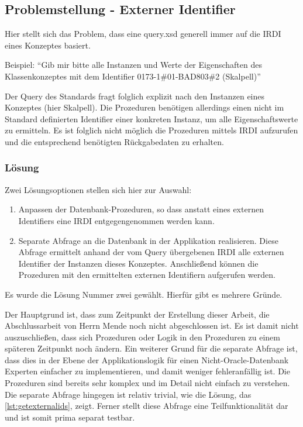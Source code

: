 \subsection{Problemstellung - Externer Identifier}\label{sec:problemidentifier}

Hier stellt sich das Problem, dass eine query.xsd generell immer auf die \gls{IRDI} eines Konzeptes basiert.

Beispiel: \enquote{Gib mir bitte alle Instanzen und Werte der Eigenschaften des Klassenkonzeptes mit dem Identifier 0173-1\#01-BAD803\#2 (Skalpell)}

Der Query des Standards fragt folglich explizit nach den Instanzen eines Konzeptes (hier Skalpell). Die Prozeduren benötigen allerdings einen nicht im Standard definierten Identifier einer konkreten Instanz, um alle Eigenschaftswerte zu ermitteln. Es ist folglich nicht möglich die Prozeduren mittels \gls{IRDI} aufzurufen und die entsprechend benötigten Rückgabedaten zu erhalten.

\subsubsection{Lösung}

Zwei Lösungsoptionen stellen sich hier zur Auswahl:
\begin{enumerate}
\item Anpassen der Datenbank-Prozeduren, so dass anstatt eines externen Identifiers eine \gls{IRDI} entgegengenommen werden kann.
\item Separate Abfrage an die Datenbank in der Applikation realisieren. Diese Abfrage ermittelt anhand der vom Query übergebenen \gls{IRDI} alle externen Identifier der Instanzen dieses Konzeptes. Anschließend können die Prozeduren mit den ermittelten externen Identifiern aufgerufen werden.   
\end{enumerate}

Es wurde die Lösung Nummer zwei gewählt. Hierfür gibt es mehrere Gründe. 

Der Hauptgrund ist, dass zum Zeitpunkt der Erstellung dieser Arbeit, die Abschlussarbeit von Herrn Mende noch nicht abgeschlossen ist. Es ist damit nicht auszuschließen, dass sich Prozeduren oder Logik in den Prozeduren zu einem späteren Zeitpunkt noch ändern.
Ein weiterer Grund für die separate Abfrage ist, dass dies in der Ebene der Applikationslogik für einen Nicht-\gls{Oracle}-Datenbank Experten einfacher zu implementieren, und damit weniger fehleranfällig ist. Die Prozeduren sind bereits sehr komplex und im Detail nicht einfach zu verstehen. Die separate Abfrage hingegen ist relativ trivial, wie die Lösung, das \autoref{lst:getexternalids}, zeigt.
Ferner stellt diese Abfrage eine Teilfunktionalität dar und ist somit prima separat testbar.  

